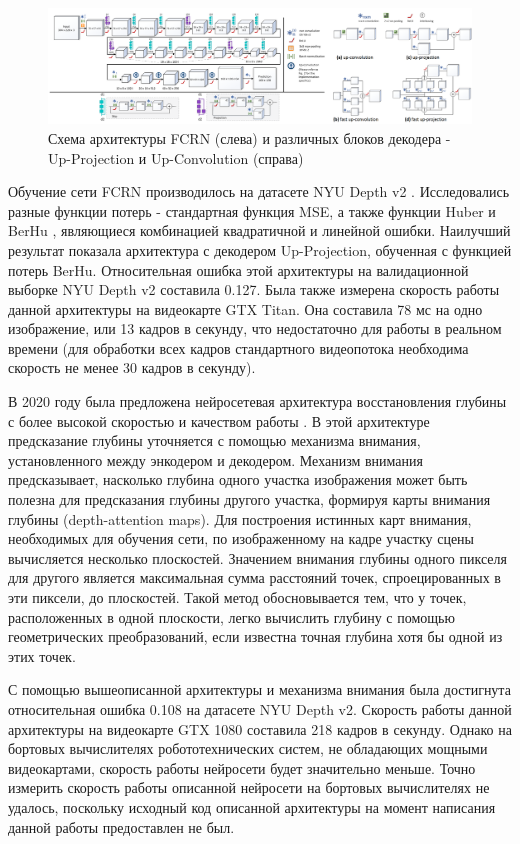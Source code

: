 \documentclass{mipt-thesis-ms}
\begin{document}
	\begin{figure}
		\includegraphics[width=1.0\textwidth]{img/fcrn_scheme_full.png}
		\caption{Схема архитектуры FCRN (слева) и различных блоков декодера - Up-Projection и Up-Convolution (справа)}
		\label{figure_upconv_upproj}
	\end{figure}

	Обучение сети FCRN производилось на датасете NYU Depth v2 \cite{silberman2012indoor}. Исследовались разные функции потерь - стандартная функция MSE, а также функции Huber и BerHu \cite{owen2007robust} \cite{zwald2012berhu}, являющиеся комбинацией квадратичной и линейной ошибки. Наилучший результат показала архитектура с декодером Up-Projection, обученная с функцией потерь BerHu. Относительная ошибка этой архитектуры на валидационной выборке NYU Depth v2 составила 0.127. Была также измерена скорость работы данной архитектуры на видеокарте GTX Titan. Она составила 78 мс на одно изображение, или 13 кадров в секунду, что недостаточно для работы в реальном времени (для обработки всех кадров стандартного видеопотока необходима скорость не менее 30 кадров в секунду).
	
	В 2020 году была предложена нейросетевая архитектура восстановления глубины с более высокой скоростью и качеством работы \cite{huynh2020guiding}. В этой архитектуре предсказание глубины уточняется с помощью механизма внимания, установленного между энкодером и декодером. Механизм внимания предсказывает, насколько глубина одного участка изображения может быть полезна для предсказания глубины другого участка, формируя карты внимания глубины (depth-attention maps). Для построения истинных карт внимания, необходимых для обучения сети, по изображенному на кадре участку сцены вычисляется несколько плоскостей. Значением внимания глубины одного пикселя для другого является максимальная сумма расстояний точек, спроецированных в эти пиксели, до плоскостей. Такой метод обосновывается тем, что у точек, расположенных в одной плоскости, легко вычислить глубину с помощью геометрических преобразований, если известна точная глубина хотя бы одной из этих точек.
	
	С помощью вышеописанной архитектуры и механизма внимания была достигнута относительная ошибка 0.108 на датасете NYU Depth v2. Скорость работы данной архитектуры на видеокарте GTX 1080 составила 218 кадров в секунду. Однако на бортовых вычислителях робототехнических систем, не обладающих мощными видеокартами, скорость работы нейросети будет значительно меньше. Точно измерить скорость работы описанной нейросети на бортовых вычислителях не удалось, поскольку исходный код описанной архитектуры на момент написания данной работы предоставлен не был.
	
\end{document}
